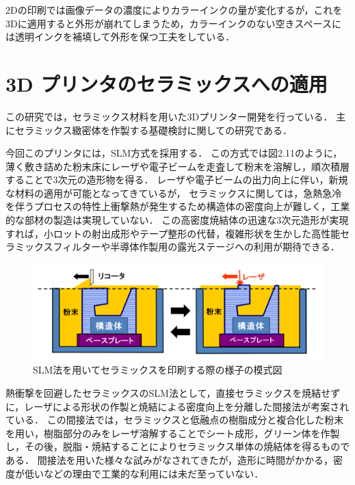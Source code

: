 2Dの印刷では画像データの濃度によりカラーインクの量が変化するが，これを3Dに適用すると外形が崩れてしまうため，カラーインクのない空きスペースには透明インクを補填して外形を保つ工夫をしている．

\section{3D プリンタのセラミックスへの適用\cite{g}}
\label{sec:enum}
この研究では，セラミックス材料を用いた3Dプリンター開発を行っている．
主にセラミックス緻密体を作製する基礎検討に関しての研究である．

今回このプリンタには，SLM方式を採用する．
この方式では図2.11のように，薄く敷き詰めた粉末床にレーザや電子ビームを走査して粉末を溶解し，順次積層することで3次元の造形物を得る．
レーザや電子ビームの出力向上に伴い，新規な材料の適用が可能となってきているが，
セラミックスに関しては，急熱急冷を伴うプロセスの特性上衝撃熱が発生するため構造体の密度向上が難しく，工業的な部材の製造は実現していない．
この高密度焼結体の迅速な3次元造形が実現すれば，小ロットの射出成形やテープ整形の代替，複雑形状を生かした高性能セラミックスフィルターや半導体作製用の露光ステージへの利用が期待できる．

\begin{figure}[H]
  \centering
  \includegraphics[width=14truecm]{./fig/seramikku1.png}
  \caption{SLM法を用いてセラミックスを印刷する際の様子の模式図}
  \label{fig:ferret}
\end{figure}

熱衝撃を回避したセラミックスのSLM法として，直接セラミックスを焼結せずに，レーザによる形状の作製と焼結による密度向上を分離した間接法が考案されている．
この間接法では，セラミックスと低融点の樹脂成分と複合化した粉末を用い，樹脂部分のみをレーザ溶解することでシート成形，グリーン体を作製し，その後，脱脂・焼結することによりセラミックス単体の焼結体を得るものである．
間接法を用いた様々な試みがなされてきたが，造形に時間がかかる，密度が低いなどの理由で工業的な利用には未だ至っていない．

